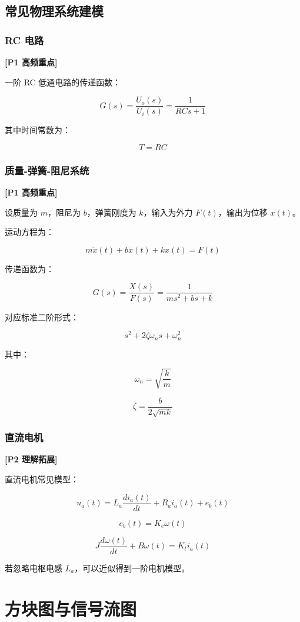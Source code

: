 \documentclass[UTF8,a4paper,12pt]{ctexart}
\newcommand{\Pone}{\textcolor{p1}{\textbf{[P1 高频重点]}}}
\newcommand{\Ptwo}{\textcolor{p2}{\textbf{[P2 理解拓展]}}}
\begin{document}
\subsection{常见物理系统建模}

\subsubsection{RC 电路}

\Pone

一阶 RC 低通电路的传递函数：

\[
G(s)=\frac{U_o(s)}{U_i(s)}=\frac{1}{RCs+1}
\]

其中时间常数为：

\[
T=RC
\]

\subsubsection{质量-弹簧-阻尼系统}

\Pone

设质量为 $m$，阻尼为 $b$，弹簧刚度为 $k$，输入为外力 $F(t)$，输出为位移 $x(t)$。

运动方程为：

\[
m\ddot{x}(t)+b\dot{x}(t)+kx(t)=F(t)
\]

传递函数为：

\[
G(s)=\frac{X(s)}{F(s)}=\frac{1}{ms^2+bs+k}
\]

对应标准二阶形式：

\[
s^2+2\zeta\omega_ns+\omega_n^2
\]

其中：

\[
\omega_n=\sqrt{\frac{k}{m}}
\]

\[
\zeta=\frac{b}{2\sqrt{mk}}
\]

\subsubsection{直流电机}

\Ptwo

直流电机常见模型：

\[
u_a(t)=L_a\frac{di_a(t)}{dt}+R_ai_a(t)+e_b(t)
\]

\[
e_b(t)=K_e\omega(t)
\]

\[
J\frac{d\omega(t)}{dt}+B\omega(t)=K_ti_a(t)
\]

若忽略电枢电感 $L_a$，可以近似得到一阶电机模型。

\section{方块图与信号流图}
\end{document}
